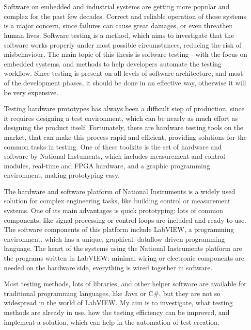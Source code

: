 \chapter{\bevezetes}

Software on embedded and industrial systems are getting more popular and complex for the past few decades. Correct and reliable operation of these systems is a major concern, since failures can cause great damages, or even threathen human lives. Software testing is a method, which aims to investigate that the software works properly under most possible circumstances, reducing the risk of misbehaviour.
The main topic of this thesis is software testing - with the focus on embedded systems, and methods to help developers automate the testing workflow. Since testing is present on all levels of software architecture, and most of the development phases, it should be done in an effective way, otherwise it will be very expensive. 

Testing hardware prototypes has always been a difficult step of production, since it requires designing a test environment, which can be nearly as much effort as designing the product itself. Fortunately, there are hardware testing tools on the market, that can make this process rapid and efficient, providing solutions for the common tasks in testing. One of these toolkits is the set of hardware and software by National Instuments, which includes measurement and control modules, real-time and FPGA hardware, and a graphic programming environment, making prototyping easy.

The hardware and software platform of National Instruments is a widely used solution for complex engineering tasks, like building control or measurement systems. One of its main advantages is quick prototyping: lots of common components, like signal processing or control loops are included and ready to use. The software components of this platform include LabVIEW, a programming environment, which has a unique, graphical, dataflow-driven programming language. The heart of the systems using the National Instruments platform are the programs written in LabVIEW: minimal wiring or electronic components are needed on the hardware side, everything is wired together in software.

Most testing methods, lots of libraries, and other helper software are available for traditional programming languages, like Java or C\#, but they are not so widespread in the world of LabVIEW. My aim is to investigate, what testing methods are already in use, how the testing efficiency can be improved, and implement a solution, which can help in the automation of test creation.
